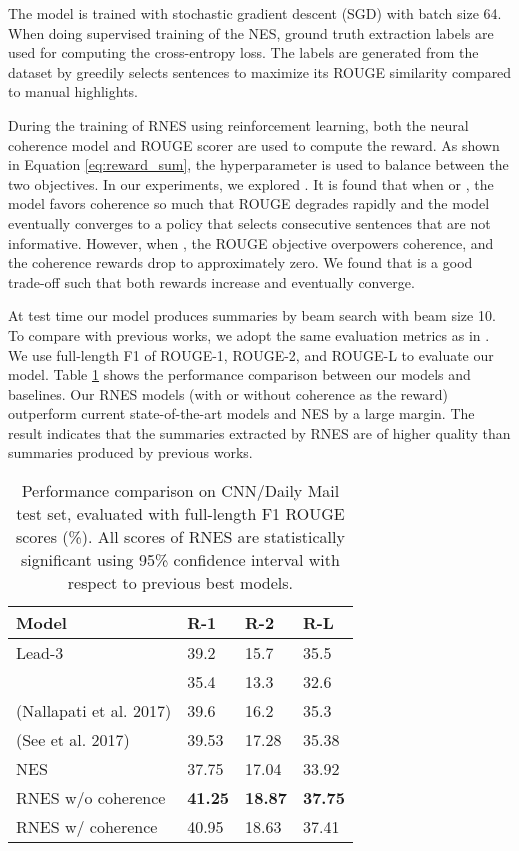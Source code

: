 \documentclass[letterpaper]{article} \usepackage{aaai18}  \usepackage{times}  \usepackage{helvet}  \usepackage{courier}  \usepackage{url}  \usepackage{graphicx}  \usepackage{amssymb}
\begin{document}
	The model is trained with stochastic gradient descent (SGD) with batch size 64. When doing supervised training of the NES, ground truth extraction labels are used for computing the cross-entropy loss. The labels are generated from the dataset by greedily selects sentences to maximize its ROUGE similarity compared to manual highlights.
	
	During the training of RNES using reinforcement learning, both the neural coherence model and ROUGE scorer are used to compute the reward. As shown in Equation \ref{eq:reward_sum}, the hyperparameter  is used to balance between the two objectives. In our experiments, we explored . It is found that when  or , the model favors coherence so much that ROUGE degrades rapidly and the model eventually converges to a policy that selects consecutive sentences that are not informative. However, when , the ROUGE objective overpowers coherence, and the coherence rewards drop to approximately zero. We found that  is a good trade-off such that both rewards increase and eventually converge.
	
	At test time our model produces summaries by beam search with beam size 10. To compare with previous works, we adopt the same evaluation metrics as in \cite{SummaRuNNer}. We use full-length F1 of ROUGE-1, ROUGE-2, and ROUGE-L to evaluate our model. Table \ref{tab:rouge_cnn_dm} shows the performance comparison between our models and baselines. Our RNES models (with or without coherence as the reward) outperform current state-of-the-art models and NES by a large margin. The result indicates that the summaries extracted by RNES are of higher quality than summaries produced by previous works.
	

	\begin{table}[ht]
		\centering
		\caption{Performance comparison on CNN/Daily Mail test set, evaluated with full-length F1 ROUGE scores (\%). All scores of RNES are statistically significant using 95\% confidence interval with respect to previous best models.}
		\label{tab:rouge_cnn_dm}
		\begin{tabular}{|p{32mm}|p{12mm}|p{12mm}|p{11mm}|}
			\hline
			Model&R-1&R-2&R-L\\\hline
			Lead-3&39.2&15.7&35.5\\
			\cite{nallapati_ramesh_abstractive_2016}&35.4&13.3&32.6\\
			(Nallapati et al. 2017) &39.6&16.2&35.3\\
			(See et al. 2017)&39.53&17.28&35.38\\
			NES & 37.75 & 17.04 & 33.92\\\hline
			RNES w/o coherence&\textbf{41.25}&\textbf{18.87}&\textbf{37.75}\\
			RNES w/ coherence&40.95&18.63&37.41\\\hline
		\end{tabular}
	\end{table}
\end{document}
